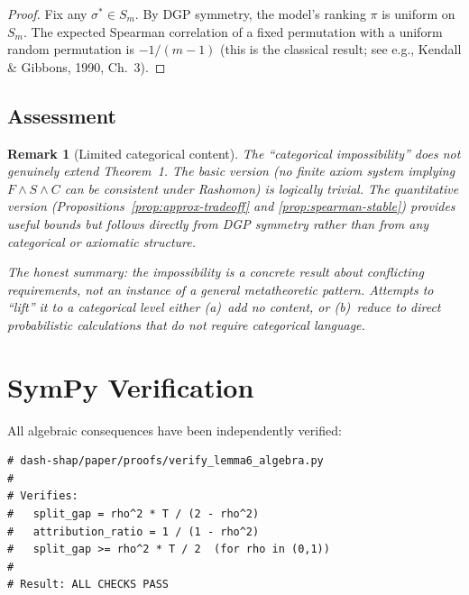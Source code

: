 \documentclass{article}
\newtheorem{remark}[theorem]{Remark}
\begin{document}
\begin{proof}
Fix any $\sigma^* \in S_m$. By DGP symmetry, the model's
ranking $\pi$ is uniform on $S_m$. The expected Spearman
correlation of a fixed permutation with a uniform random
permutation is $-1/(m-1)$ (this is the classical result;
see e.g., Kendall \& Gibbons, 1990, Ch.~3).
\end{proof}

\subsection{Assessment}

\begin{remark}[Limited categorical content]
\label{rem:categorical-limited}
The ``categorical impossibility'' does not genuinely extend
Theorem~1. The basic version (no finite axiom system implying
$F \wedge S \wedge C$ can be consistent under Rashomon) is
logically trivial. The quantitative version
(Propositions~\ref{prop:approx-tradeoff} and
\ref{prop:spearman-stable}) provides useful bounds but
follows directly from DGP symmetry rather than from
any categorical or axiomatic structure.

The honest summary: the impossibility is a \emph{concrete}
result about conflicting requirements, not an instance of a
general metatheoretic pattern. Attempts to ``lift'' it to a
categorical level either (a)~add no content, or (b)~reduce to
direct probabilistic calculations that do not require categorical
language.
\end{remark}


\section{SymPy Verification}

All algebraic consequences have been independently verified:

\begin{verbatim}
# dash-shap/paper/proofs/verify_lemma6_algebra.py
#
# Verifies:
#   split_gap = rho^2 * T / (2 - rho^2)
#   attribution_ratio = 1 / (1 - rho^2)
#   split_gap >= rho^2 * T / 2  (for rho in (0,1))
#
# Result: ALL CHECKS PASS
\end{verbatim}



\end{document}
